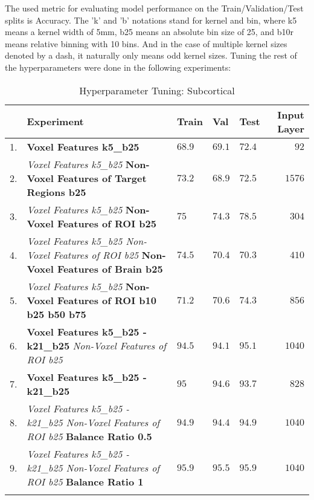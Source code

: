 The used metric for evaluating model performance on the Train/Validation/Test splits is Accuracy. The 'k' and 'b' notations stand for kernel and bin, where k5 means a kernel width of 5mm, b25 means an absolute bin size of 25, and b10r means relative binning with 10 bins. And in the case of multiple kernel sizes denoted by a dash, it naturally only means odd kernel sizes. Tuning the rest of the hyperparameters were done in the following experiments:

\begin{longtable}[H]{|r|p{9cm}|l|l|l|r|}
\hline
 & \textbf{Experiment} & \textbf{Train} & \textbf{Val} & \textbf{Test} & \textbf{Input Layer} \\ \hline
1. & \textbf{Voxel Features k5\_b25} & $68.9$ & $69.1$ & $72.4$ & $92$  \\ \hline
2. & \emph{Voxel Features k5\_b25} \newline \textbf{Non-Voxel Features of Target Regions b25} & $73.2$ & $68.9$ & $72.5$ & $1576$ \\ \hline
3. & \emph{Voxel Features k5\_b25} \newline \textbf{Non-Voxel Features of ROI b25} & $75$ & $74.3$ & $78.5$ & $304$ \\ \hline
4. & \emph{Voxel Features k5\_b25 \newline Non-Voxel Features of ROI b25} \newline \textbf{Non-Voxel Features of Brain b25} & $74.5$ & $70.4$ & $70.3$ & $410$ \\ \hline
5. & \emph{Voxel Features k5\_b25} \newline \textbf{Non-Voxel Features of ROI b10 b25 b50 b75} & $71.2$ & $70.6$ & $74.3$ & $856$ \\ \hline
6. & \textbf{Voxel Features k5\_b25 - k21\_b25} \newline \emph{Non-Voxel Features of ROI b25} & $94.5$ & $94.1$ & $95.1$ & $1040$ \\ \hline
7. & \textbf{Voxel Features k5\_b25 - k21\_b25} & $95$ & $94.6$ & $93.7$ & $828$ \\ \hline
8. & \emph{Voxel Features k5\_b25 - k21\_b25 \newline Non-Voxel Features of ROI b25} \newline \textbf{Balance Ratio 0.5} & $94.9$ & $94.4$ & $94.9$ & $1040$ \\ \hline
9. & \emph{Voxel Features k5\_b25 - k21\_b25 \newline Non-Voxel Features of ROI b25} \newline \textbf{Balance Ratio 1} & $95.9$ & $95.5$ & $95.9$ & $1040$ \\ \hline
\caption{Hyperparameter Tuning: Subcortical}
\end{longtable}

